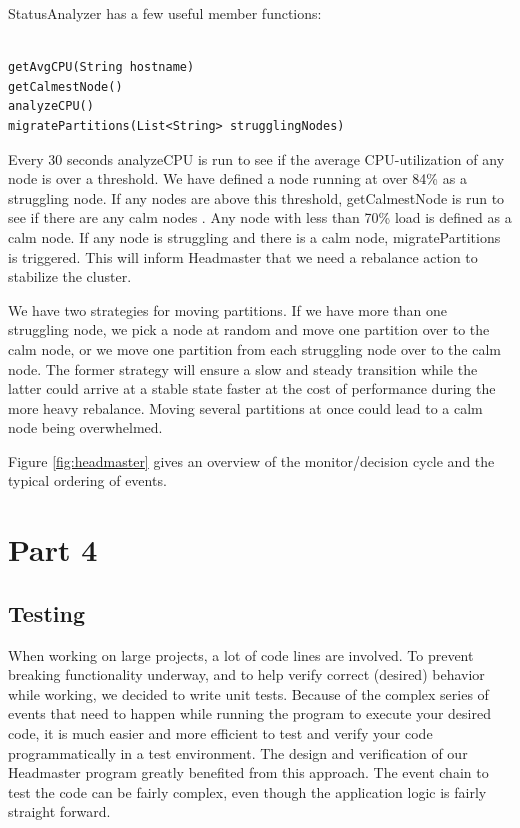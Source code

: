 StatusAnalyzer has a few useful member functions:

\begin{lstlisting}[style=customjava,label=lst:test,caption={Helper functions in StatusAnalyzer.}]

getAvgCPU(String hostname)
getCalmestNode()
analyzeCPU()
migratePartitions(List<String> strugglingNodes)

\end{lstlisting}

Every 30 seconds analyzeCPU is run to see if the average CPU-utilization of any node is over a threshold. We have defined a node running at over 84\% as a struggling node. If any nodes are above this threshold, getCalmestNode is run to see if there are any calm nodes . Any node with less than 70\% load is defined as a calm node. If any node is struggling and there is a calm node, migratePartitions is triggered. This will inform Headmaster that we need a rebalance action to stabilize the cluster. 

We have two strategies for moving partitions. If we have more than one struggling node, we pick a node at random and move one partition over to the calm node, or we move one partition from each struggling node over to the calm node. The former strategy will ensure a slow and steady transition while the latter could arrive at a stable state faster at the cost of performance during the more heavy rebalance. Moving several partitions at once could lead to a calm node being overwhelmed.

Figure \ref{fig:headmaster} gives an overview of the monitor/decision cycle and the typical ordering of events.

\section{Part 4}
\subsection{Testing}
When working on large projects, a lot of code lines are involved. To prevent breaking functionality underway, and to help verify correct (desired) behavior while working, we decided to write unit tests. 
Because of the complex series of events that need to happen while running the program to execute your desired code, it is much easier and more efficient to test and verify your code programmatically in a test environment. The design and verification of our Headmaster program greatly benefited from this approach. The event chain to test the code can be fairly complex, even though the application logic is fairly straight forward.

